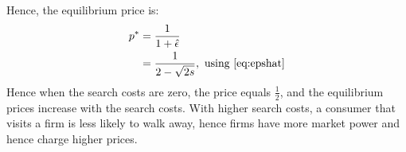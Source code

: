 \documentclass[a4paper,11pt]{article}
\numberwithin{equation}{section}
\newcommand{\1}[1]{\,\mathbb{1}_{#1}} %
\begin{document}
Hence, the equilibrium price is:
\begin{align}
	p^* & =\frac{1}{1+\hat\epsilon}                            \\
	    & =\frac{1}{2-\sqrt{2s}},\text{ using \ref{eq:epshat}}
\end{align}
Hence when the search costs are zero, the price equals $\frac{1}{2}$,
and the equilibrium prices increase with the search costs. With higher search
costs, a consumer that visits a firm is less likely to walk away, hence
firms have more market power and hence charge higher prices.
\end{document}
